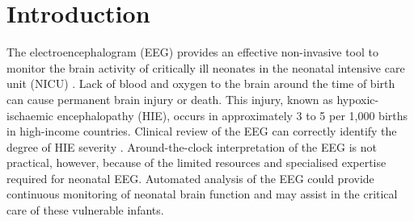 \documentclass[conference]{IEEEtran}
\begin{document}
\begin{abstract}
\end{abstract}


\section{Introduction}
\label{introduction}

The electroencephalogram (EEG) provides an effective non-invasive tool to monitor the brain activity of critically ill neonates in the neonatal intensive care unit (NICU) \cite{Scher2002}. Lack of blood and oxygen to the brain around the time of birth can cause permanent brain injury or death. This injury, known as hypoxic-ischaemic encephalopathy (HIE), occurs in approximately 3 to 5 per 1,000 births in high-income countries.
Clinical review of the EEG can correctly identify the degree of HIE severity \cite{murray}.
Around-the-clock interpretation of the EEG is not practical, however, because of the limited resources and specialised expertise required for neonatal EEG. Automated analysis of the EEG could provide continuous monitoring of neonatal brain function and may assist in the critical care of these vulnerable infants.
\end{document}
